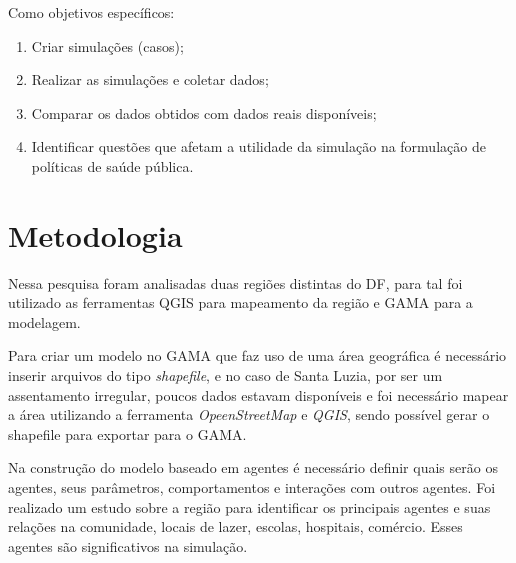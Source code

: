 Como objetivos específicos: 
\begin{enumerate}
\item Criar simulações (casos);
\item Realizar as simulações e coletar dados;
\item Comparar os dados obtidos com dados reais disponíveis;
\item Identificar questões que afetam a utilidade da simulação na formulação de políticas de saúde pública.


\end{enumerate}
\section{Metodologia}%

Nessa pesquisa foram analisadas duas regiões distintas do DF, para tal foi utilizado as ferramentas QGIS para mapeamento da região e GAMA para a modelagem. 

Para criar um modelo no GAMA que faz uso de uma área geográfica é necessário inserir arquivos do tipo \textit{shapefile}, e no caso de Santa Luzia, por ser um assentamento irregular, poucos dados estavam disponíveis e foi necessário mapear a área utilizando a ferramenta \textit{OpeenStreetMap} e \textit{QGIS}, sendo possível gerar o shapefile para exportar para o GAMA.

Na construção do modelo baseado em agentes é necessário definir quais serão os agentes, seus parâmetros, comportamentos e interações com outros agentes. Foi realizado um estudo sobre a região para identificar os principais agentes e suas relações na comunidade, locais de lazer, escolas, hospitais, comércio. Esses  agentes são significativos na simulação.

